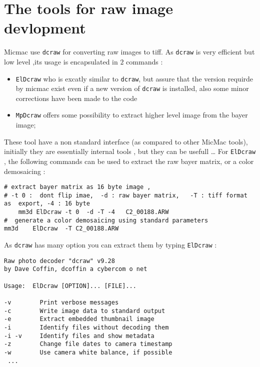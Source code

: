\section{The tools for raw image devlopment} 

Micmac use {\tt dcraw} for converting raw images to tiff. As {\tt dcraw} is very
efficient but low level ,its usage is encapsulated in $2$ commands :

\begin{itemize}
	\item {\tt ElDcraw} who is excatly similar to {\tt dcraw}, but assure that the version requirde by
      micmac exist even if a new version of {\tt dcraw} is installed, also some minor corrections have
     been made to the code

       \item {\tt MpDcraw} offers some possibility to extract higher level image from the bayer image;

\end{itemize}

These tool have a non standard interface (as compared to other MicMac tools), initially they are essentially
internal tools , but they can be usefull \dots
For {\tt ElDcraw} , the following commands can be used to extract the raw bayer matrix, or a color demosaicing  :

\begin{verbatim}
# extract bayer matrix as 16 byte image , 
# -t 0 :  dont flip imae,  -d : raw bayer matrix,   -T : tiff format as  export, -4 : 16 byte
    mm3d ElDcraw -t 0  -d -T -4   C2_00188.ARW
#  generate a color demosaicing using standard parameters
mm3d    ElDcraw  -T C2_00188.ARW
\end{verbatim}

As {\tt dcraw} has many option you can extract them by typing {\tt ElDcraw} :


\begin{verbatim}
Raw photo decoder "dcraw" v9.28
by Dave Coffin, dcoffin a cybercom o net

Usage:  ElDcraw [OPTION]... [FILE]...

-v        Print verbose messages
-c        Write image data to standard output
-e        Extract embedded thumbnail image
-i        Identify files without decoding them
-i -v     Identify files and show metadata
-z        Change file dates to camera timestamp
-w        Use camera white balance, if possible
 ...
\end{verbatim}


